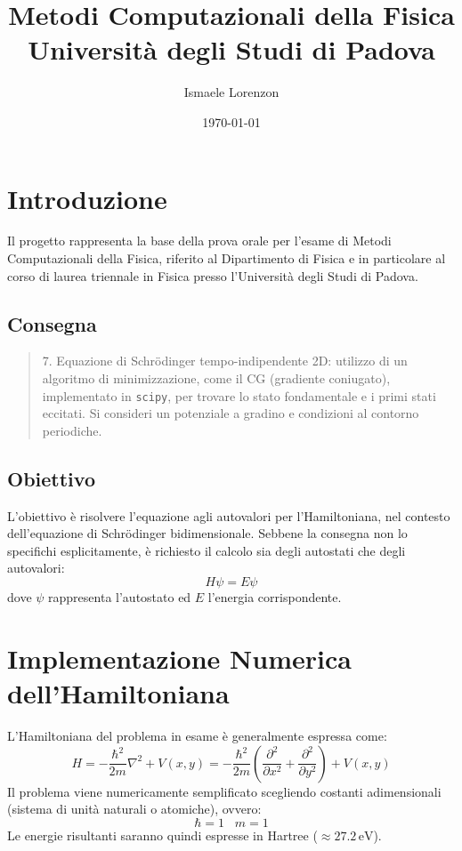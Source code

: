 \documentclass{article}
\title{Metodi Computazionali della Fisica\\Università degli Studi di Padova}
\author{Ismaele Lorenzon}
\date{\today}
\begin{document}
\maketitle

\section{Introduzione}
Il progetto rappresenta la base della prova orale per l'esame di Metodi Computazionali della Fisica, riferito al Dipartimento di Fisica e in particolare al corso di laurea triennale in Fisica presso l'Università degli Studi di Padova.

\subsection{Consegna}
\begin{center}
\begin{quote}
7. Equazione di Schrödinger tempo-indipendente 2D: utilizzo di un algoritmo di 
minimizzazione, come il CG (gradiente coniugato), implementato in \texttt{scipy}, per trovare lo 
stato fondamentale e i primi stati eccitati. Si consideri un potenziale a gradino e 
condizioni al contorno periodiche. 
\end{quote}
\end{center}

\subsection{Obiettivo}
L'obiettivo è risolvere l'equazione agli autovalori per l'Hamiltoniana, nel contesto dell’equazione di Schrödinger bidimensionale. Sebbene la consegna non lo specifichi esplicitamente, è richiesto il calcolo sia degli autostati che degli autovalori:
\begin{equation}
    H\psi=E\psi
\end{equation}
dove $\psi$ rappresenta l'autostato ed $E$ l'energia corrispondente.

\section{Implementazione Numerica dell'Hamiltoniana}
L’Hamiltoniana del problema in esame è generalmente espressa come:
\begin{equation}
    H = -\frac{\hbar^2}{2m} \nabla^2 + V(x,y) = -\frac{\hbar^2}{2m} \left(\frac{\partial^2}{\partial x^2} + \frac{\partial^2}{\partial y^2}\right) + V(x,y)
\end{equation}
Il problema viene numericamente semplificato scegliendo costanti adimensionali (sistema di unità naturali o atomiche), ovvero:
\begin{equation}
    \hbar=1 \hspace{10pt} m=1
\end{equation}
Le energie risultanti saranno quindi espresse in Hartree ($\approx 27.2\,\text{eV}$).
\end{document}
